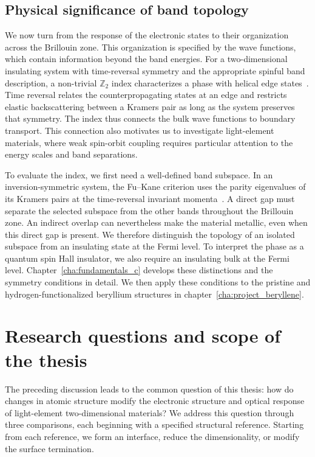\subsection{Physical significance of band topology}
\label{subsec:topo_motivation}

We now turn from the response of the electronic states to their organization across the Brillouin zone.
This organization is specified by the wave functions, which contain information beyond the band energies.
For a two-dimensional insulating system with time-reversal symmetry and the appropriate spinful band description, a non-trivial $\mathbb{Z}_2$ index characterizes a phase with helical edge states~\cite{fu2007topological}.
Time reversal relates the counterpropagating states at an edge and restricts elastic backscattering between a Kramers pair as long as the system preserves that symmetry.
The index thus connects the bulk wave functions to boundary transport.
This connection also motivates us to investigate light-element materials, where weak spin-orbit coupling requires particular attention to the energy scales and band separations.

To evaluate the index, we first need a well-defined band subspace.
In an inversion-symmetric system, the Fu--Kane criterion uses the parity eigenvalues of its Kramers pairs at the time-reversal invariant momenta~\cite{fu2007topological}.
A direct gap must separate the selected subspace from the other bands throughout the Brillouin zone.
An indirect overlap can nevertheless make the material metallic, even when this direct gap is present.
We therefore distinguish the topology of an isolated subspace from an insulating state at the Fermi level.
To interpret the phase as a quantum spin Hall insulator, we also require an insulating bulk at the Fermi level.
Chapter~\ref{cha:fundamentals_c} develops these distinctions and the symmetry conditions in detail.
We then apply these conditions to the pristine and hydrogen-functionalized beryllium structures in chapter~\ref{cha:project_beryllene}.

\section{Research questions and scope of the thesis}
\label{sec:intro_gaps}

The preceding discussion leads to the common question of this thesis: how do changes in atomic structure modify the electronic structure and optical response of light-element two-dimensional materials?
We address this question through three comparisons, each beginning with a specified structural reference.
Starting from each reference, we form an interface, reduce the dimensionality, or modify the surface termination.

